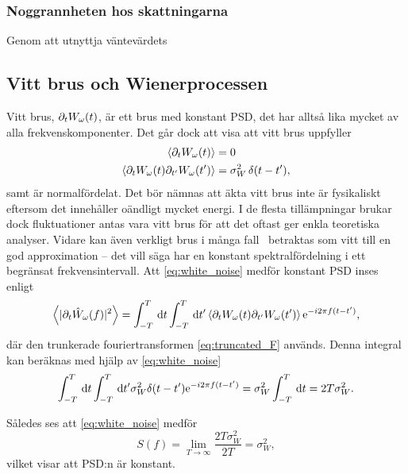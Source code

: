 \subsubsection{Noggrannheten hos skattningarna}
Genom att utnyttja väntevärdets 


\subsection{Vitt brus och Wienerprocessen}\label{sec:white_noise}
Vitt brus, $\partial_tW_\omega(t)$,\footnotemark{} är ett brus med konstant PSD, det har alltså lika mycket av alla frekvenskomponenter. Det går dock att visa att vitt brus uppfyller \cite{Miller_probability2012}
\begin{equation}\label{eq:white_noise}
\begin{aligned}
\ev{\pd_tW_\omega(t)}&=0 \\
\ev{\pd_tW_\omega(t)\pd_{t'}W_\omega(t')}&= \sigma_W^2 \, \delta(t-t'),
\end{aligned}
\end{equation}
samt är normalfördelat. 
Det bör nämnas att äkta vitt brus inte är fysikaliskt eftersom det innehåller oändligt mycket energi. I de flesta tillämpningar brukar dock fluktuationer antas vara vitt brus för att det oftast ger enkla teoretiska analyser. Vidare kan även verkligt brus i många fall~\cite{Engelberg_noise2007} betraktas som vitt till en god approximation -- det vill säga har en konstant spektralfördelning i ett begränsat frekvensintervall. Att \eqref{eq:white_noise} medför konstant PSD inses enligt  
\begin{equation}
    \ev{|\pd_t\hat{W}_\omega(f)|^2} = \int_{-T}^{T}\id{t}\int_{-T}^{T}\id{t'}\ev{\pd_tW_\omega(t)\pd_{t'}W_\omega(t')}\ee^{-i2\pi f(t-t')},
\end{equation}
där den trunkerade fouriertransformen \eqref{eq:truncated_F} används. Denna integral kan beräknas med hjälp av \eqref{eq:white_noise}
\begin{equation}
    \int_{-T}^{T}\,\mathrm{d}{t}\int_{-T}^{T}\,\mathrm{d}{t'} \sigma_W^2 \delta(t-t')\mathrm{e}^{-i2\pi f(t-t')} = \sigma_W^2 \int_{-T}^{T}\,\mathrm{d}{t} =2T\sigma_W^2.
\end{equation}

Således ses att \eqref{eq:white_noise} medför 
\begin{equation}
    S(f) = \lim_{T\to\infty}\dfrac{2T\sigma_W^2}{2T} = \sigma_W^2,
\end{equation}
vilket visar att PSD:n är konstant. 


